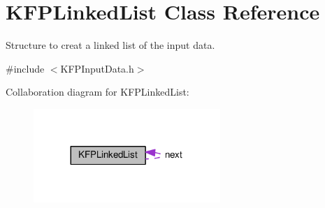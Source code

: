 \hypertarget{structKFPLinkedList}{}\section{K\+F\+P\+Linked\+List Class Reference}
\label{structKFPLinkedList}


Structure to creat a linked list of the input data.  




{\ttfamily \#include $<$K\+F\+P\+Input\+Data.\+h$>$}



Collaboration diagram for K\+F\+P\+Linked\+List\+:
\nopagebreak
\begin{figure}[H]
\begin{center}
\leavevmode
\includegraphics[width=200pt]{structKFPLinkedList__coll__graph}
\end{center}
\end{figure}
